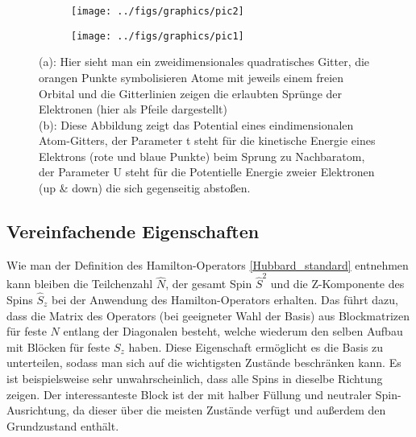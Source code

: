 \begin{figure}[h!]
	\begin{subfigure}{.5 \textwidth}
		\centering
		\texttt{[image: ../figs/graphics/pic2]}
		\caption{\cite{FigHubbardModel2}}
		\label{fig:pic2}
	\end{subfigure}
	\begin{subfigure}{.5 \textwidth}
		\centering
		\texttt{[image: ../figs/graphics/pic1]}
		\caption{\cite{FigHubbardModel1}}
		\label{fig:pic1}
	\end{subfigure}
\caption[Veranschaulichung des Hubbard-Modells]{(a): Hier sieht man ein zweidimensionales quadratisches Gitter, die orangen Punkte symbolisieren Atome mit jeweils einem freien Orbital und die Gitterlinien zeigen die erlaubten Sprünge der Elektronen (hier als Pfeile dargestellt)\\(b): Diese Abbildung zeigt das Potential eines eindimensionalen Atom-Gitters, der Parameter t steht für die kinetische Energie eines Elektrons (rote und blaue Punkte) beim Sprung zu Nachbaratom, der Parameter U steht für die Potentielle Energie zweier Elektronen (up \& down) die sich gegenseitig abstoßen.}
\label{HubbardFigs}
\end{figure}


\subsection{Vereinfachende Eigenschaften}
Wie man der Definition des Hamilton-Operators \eqref{Hubbard_standard} entnehmen kann bleiben die Teilchenzahl $ \hat{N} $, der gesamt Spin $ \hat{S}^2 $ und die Z-Komponente des Spins $ \hat{S}_z $ bei der Anwendung des Hamilton-Operators erhalten. Das führt dazu, dass die Matrix des Operators (bei geeigneter Wahl der Basis) aus Blockmatrizen für feste $ N $ entlang der Diagonalen besteht, welche wiederum den selben Aufbau mit Blöcken für feste $ S_z $ haben. Diese Eigenschaft ermöglicht es die Basis zu unterteilen, sodass man sich auf die wichtigsten Zustände beschränken kann. Es ist beispielsweise sehr unwahrscheinlich, dass alle Spins in dieselbe Richtung zeigen. Der interessanteste Block ist der mit halber Füllung und neutraler Spin-Ausrichtung, da dieser über die meisten Zustände verfügt und außerdem den Grundzustand enthält.

